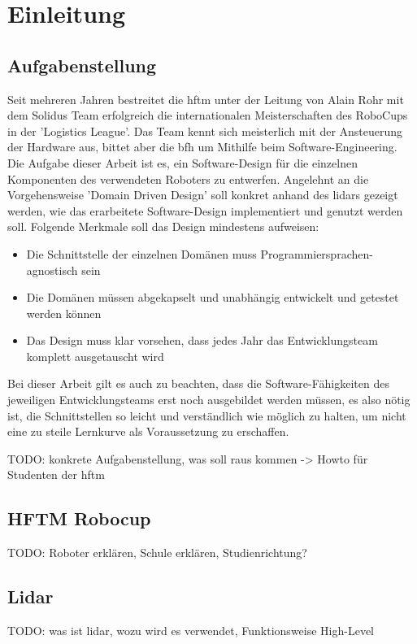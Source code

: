 \chapter{Einleitung}
\section{Aufgabenstellung}
Seit mehreren Jahren bestreitet die \acrshort{hftm} unter der Leitung von Alain Rohr mit dem Solidus Team erfolgreich die internationalen Meisterschaften des RoboCups in der 'Logistics League'.
Das Team kennt sich meisterlich mit der Ansteuerung der Hardware aus, bittet aber die \acrshort{bfh} um Mithilfe beim Software-Engineering.
Die Aufgabe dieser Arbeit ist es, ein Software-Design für die einzelnen Komponenten des verwendeten Roboters zu entwerfen. Angelehnt an die Vorgehensweise 'Domain Driven Design' soll konkret anhand des \acrshort{lidar}s gezeigt werden, wie das erarbeitete Software-Design implementiert und genutzt werden soll. Folgende Merkmale soll das Design mindestens aufweisen:

\begin{itemize}
	\item
	Die Schnittstelle der einzelnen Domänen muss Programmiersprachen-agnostisch sein
	
	\item
	Die Domänen müssen abgekapselt und unabhängig entwickelt und getestet werden können
	
	\item
	Das Design muss klar vorsehen, dass jedes Jahr das Entwicklungsteam komplett ausgetauscht wird
\end{itemize}
Bei dieser Arbeit gilt es auch zu beachten, dass die Software-Fähigkeiten des jeweiligen Entwicklungsteams erst noch ausgebildet werden müssen, es also nötig ist, die Schnittstellen so leicht und verständlich wie möglich zu halten, um nicht eine zu steile Lernkurve als Voraussetzung zu erschaffen.


\bigskip
TODO:
konkrete Aufgabenstellung, was soll raus kommen -> Howto für Studenten der \acrshort{hftm}

\section{HFTM Robocup}
TODO:
Roboter erklären, Schule erklären, Studienrichtung?

\section{Lidar}
TODO:
was ist \acrshort{lidar}, wozu wird es verwendet, Funktionsweise High-Level



